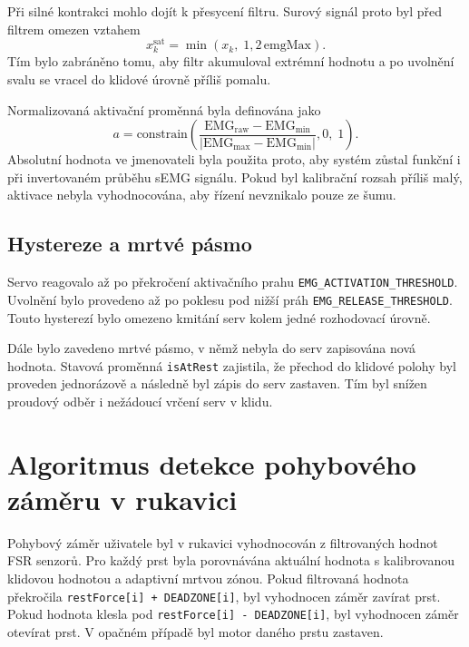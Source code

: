 Při silné kontrakci mohlo dojít k přesycení filtru. Surový signál proto byl před filtrem omezen vztahem
\begin{equation}
    x_k^{\mathrm{sat}} = \min\left(x_k,\;1{,}2\,\mathrm{emgMax}\right).
\end{equation}
Tím bylo zabráněno tomu, aby filtr akumuloval extrémní hodnotu a po uvolnění svalu se vracel do klidové úrovně příliš pomalu.

Normalizovaná aktivační proměnná byla definována jako
\begin{equation}
    a = \mathrm{constrain}\!\left(
        \frac{\mathrm{EMG}_{\mathrm{raw}} - \mathrm{EMG}_{\min}}
             {\left|\mathrm{EMG}_{\max} - \mathrm{EMG}_{\min}\right|},
        0,\;1
    \right).
\end{equation}
Absolutní hodnota ve jmenovateli byla použita proto, aby systém zůstal funkční i při invertovaném průběhu sEMG signálu. Pokud byl kalibrační rozsah příliš malý, aktivace nebyla vyhodnocována, aby řízení nevznikalo pouze ze šumu.

\subsection{Hystereze a mrtvé pásmo}
\label{subsec:hystereze-semgg}

Servo reagovalo až po překročení aktivačního prahu \texttt{EMG\_ACTIVATION\_THRESHOLD}. Uvolnění bylo provedeno až po poklesu pod nižší práh \texttt{EMG\_RELEASE\_THRESHOLD}. Touto hysterezí bylo omezeno kmitání serv kolem jedné rozhodovací úrovně.

Dále bylo zavedeno mrtvé pásmo, v němž nebyla do serv zapisována nová hodnota. Stavová proměnná \texttt{isAtRest} zajistila, že přechod do klidové polohy byl proveden jednorázově a následně byl zápis do serv zastaven. Tím byl snížen proudový odběr i nežádoucí vrčení serv v klidu.

\section{Algoritmus detekce pohybového záměru v rukavici}
\label{sec:algoritmus-zameru}

Pohybový záměr uživatele byl v rukavici vyhodnocován z filtrovaných hodnot FSR senzorů. Pro každý prst byla porovnávána aktuální hodnota s kalibrovanou klidovou hodnotou a adaptivní mrtvou zónou. Pokud filtrovaná hodnota překročila \texttt{restForce[i] + DEADZONE[i]}, byl vyhodnocen záměr zavírat prst. Pokud hodnota klesla pod \texttt{restForce[i] - DEADZONE[i]}, byl vyhodnocen záměr otevírat prst. V opačném případě byl motor daného prstu zastaven.

